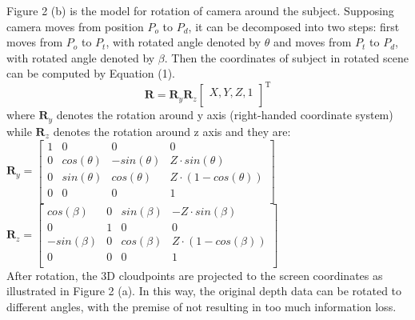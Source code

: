\documentclass[conference]{IEEEtran}
\begin{document}
Figure 2 (b) is the model for rotation of camera around the subject. Supposing camera moves from position $P_{o}$ to $P_{d}$, it can be decomposed into two steps: first moves from $P_{o}$ to $P_{t}$, with rotated angle denoted by $\theta$ and moves from $P_{t}$ to $P_{d}$, with rotated angle denoted by $\beta$. Then the coordinates of subject in rotated scene can be computed by Equation (1).\\
\begin{equation}
\mathbf R  = \mathbf R_{y}\mathbf R_{z}
\begin{bmatrix}
 X, Y, Z, 1 \\     
\end{bmatrix}^ \mathrm{ T }
\end{equation}
where $\mathbf R_{y}$ denotes the rotation around y axis (right-handed coordinate system) while $\mathbf R_{z}$ denotes the rotation around z axis and they are: \\
$\mathbf R_{y} = 
\begin{bmatrix}
 1 & 0 & 0 & 0\\     
 0 & cos(\theta) & -sin(\theta) & Z\cdot sin(\theta)\\ 
 0 & sin(\theta) & cos(\theta) & Z\cdot (1 - cos(\theta))\\
 0 & 0 & 0 & 1\\  
\end{bmatrix}$\\
$\mathbf R_{z} = 
\begin{bmatrix}
 cos(\beta) & 0 & sin(\beta) & -Z\cdot sin(\beta)\\     
 0 & 1 & 0 & 0\\ 
 -sin(\beta) & 0 & cos(\beta) & Z\cdot (1 - cos(\beta))\\
 0 & 0 & 0 & 1\\     
\end{bmatrix} $\\

%
%

After rotation, the 3D cloudpoints are projected to the screen coordinates as illustrated in Figure 2 (a). In this way, the original depth data can be rotated to different angles, with the premise of not resulting in too much information loss.
\end{document}
